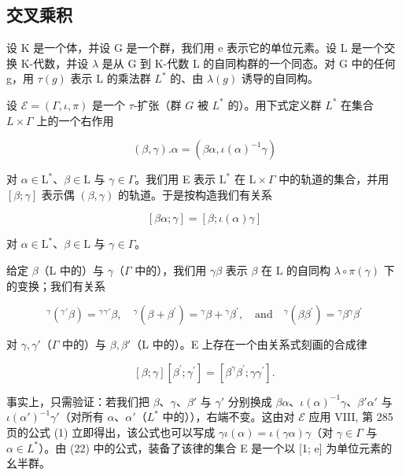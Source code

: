 \subsection{交叉乘积}

设 K 是一个体，并设 G 是一个群，我们用 e 表示它的单位元素。设 L 是一个交换 K-代数，并设 \(\lambda\) 是从 G 到 K-代数 L 的自同构群的一个同态。对 G 中的任何 g，用 \(\tau(g)\) 表示 L 的乘法群 \(L^{*}\) 的、由 \(\lambda(g)\) 诱导的自同构。

设 \(\mathcal{E} = (\Gamma, \iota, \pi)\) 是一个 \(\tau\)-扩张（群 \(G\) 被 \(L^*\) 的）。用下式定义群 \(L^*\) 在集合 \(L \times \Gamma\) 上的一个右作用

\[
(\beta , \gamma). \alpha = (\beta \alpha , \iota (\alpha) ^ {- 1} \gamma)\tag{20}
\]

对 \(\alpha \in \mathrm{L}^*\)、\(\beta \in \mathrm{L}\) 与 \(\gamma \in \Gamma\)。我们用 E 表示 \(\mathrm{L}^*\) 在 \(\mathrm{L} \times \Gamma\) 中的轨道的集合，并用 \([\beta; \gamma]\) 表示偶 \((\beta, \gamma)\) 的轨道。于是按构造我们有关系

\[
[ \beta \alpha ; \gamma ] = [ \beta ; \iota (\alpha) \gamma ]\tag{21}
\]

对 \(\alpha\in\mathrm{L}^{*}\)、\(\beta\in\mathrm{L}\) 与 \(\gamma\in\Gamma\)。

给定 \(\beta\)（L 中的）与 \(\gamma\)（\(\Gamma\) 中的），我们用 \(\gamma\beta\) 表示 \(\beta\) 在 L 的自同构 \(\lambda\circ\pi(\gamma)\) 下的变换；我们有关系

\[
{ } ^ { \gamma } ( { } ^ { \gamma } { } ^ { \prime } \beta ) = { } ^ { \gamma } { } ^ { \gamma } { } ^ { \prime } \beta   , \quad { } ^ { \gamma } ( \beta + \beta ^ { \prime } ) = { } ^ { \gamma } \beta + { } ^ { \gamma } \beta ^ { \prime }   , \quad \text {and} \quad { } ^ { \gamma } ( \beta \beta ^ { \prime } ) = { } ^ { \gamma } \beta   { } ^ { \gamma } \beta ^ { \prime }\tag{22}
\]

对 \(\gamma,\gamma'\)（\(\Gamma\) 中的）与 \(\beta,\beta'\)（L 中的）。E 上存在一个由关系式刻画的合成律

\[
[ \beta ; \gamma ] [ \beta^ {\prime}; \gamma^ {\prime} ] = [ \beta^ {\gamma} \beta^ {\prime}; \gamma \gamma^ {\prime} ].\tag{23}
\]

事实上，只需验证：若我们把 \(\beta\)、\(\gamma\)、\(\beta'\) 与 \(\gamma'\) 分别换成 \(\beta\alpha\)、\(\iota(\alpha)^{-1}\gamma\)、\(\beta'\alpha'\) 与 \(\iota(\alpha')^{-1}\gamma'\)（对所有 \(\alpha\)、\(\alpha'\)（\(L^*\) 中的）），右端不变。这由对 \(\mathcal{E}\) 应用 VIII, 第 285 页的公式 (1) 立即得出，该公式也可以写成 \(\gamma\iota(\alpha) = \iota(\gamma\alpha)\gamma\)（对 \(\gamma \in \Gamma\) 与 \(\alpha \in L^*\)）。由 (22) 中的公式，装备了该律的集合 E 是一个以 {[}1; e{]} 为单位元素的幺半群。

